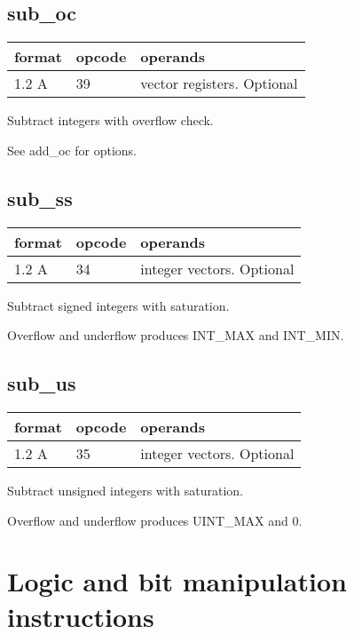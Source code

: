 \documentclass[forwardcom.tex]{subfiles}
\begin{document}
\subsection{sub\_oc}
\label{table:subOcInstruction}
\begin{tabular}{|p{12mm}|p{15mm}|p{100mm}|}
\hline
\bfseries format & \bfseries opcode & \bfseries operands \\ \hline
1.2 A & 39 & vector registers. Optional \\ \hline
\end{tabular}
\vv

Subtract integers with overflow check.

See add\_oc for options.
\vv

\subsection{sub\_ss}
\label{table:subSsInstruction}
\begin{tabular}{|p{12mm}|p{15mm}|p{100mm}|}
\hline
\bfseries format & \bfseries opcode & \bfseries operands \\ \hline
1.2 A & 34 & integer vectors. Optional \\ \hline
\end{tabular}
\vv

Subtract signed integers with saturation.

Overflow and underflow produces INT\_MAX and INT\_MIN.
\vv

\subsection{sub\_us}
\label{table:subUsInstruction}
\begin{tabular}{|p{12mm}|p{15mm}|p{100mm}|}
\hline
\bfseries format & \bfseries opcode & \bfseries operands \\ \hline
1.2 A & 35 & integer vectors. Optional \\ \hline
\end{tabular}
\vv

Subtract unsigned integers with saturation.

Overflow and underflow produces UINT\_MAX and 0.
\vv

\section{Logic and bit manipulation instructions}
\end{document}
